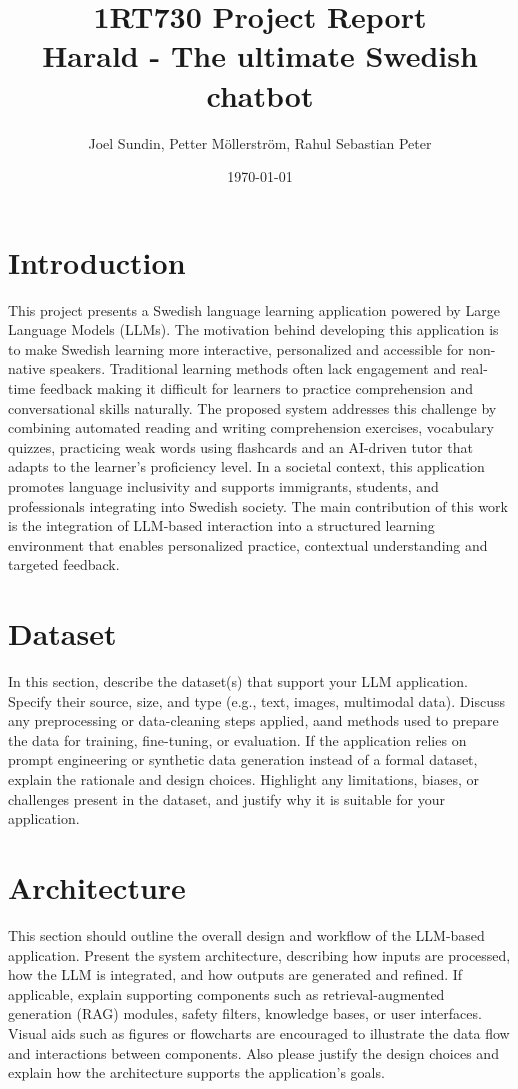 \documentclass[a4paper,10pt]{article}
\title{\textbf{1RT730 Project Report} 
	\\ Harald - The ultimate Swedish chatbot}
\author{Joel Sundin, Petter Möllerström, Rahul Sebastian Peter}
\date{\today}
\begin{document}
	
\maketitle
    
 \section{Introduction}
This project presents a Swedish language learning application powered by Large Language Models (LLMs). The motivation behind developing this application is to make Swedish learning more interactive, personalized and accessible for non-native speakers. Traditional learning methods often lack engagement and real-time feedback making it difficult for learners to practice comprehension and conversational skills naturally. The proposed system addresses this challenge by combining automated reading and writing comprehension exercises, vocabulary quizzes, practicing weak words using flashcards and an AI-driven tutor that adapts to the learner’s proficiency level. In a societal context, this application promotes language inclusivity and supports immigrants, students, and professionals integrating into Swedish society. The main contribution of this work is the integration of LLM-based interaction into a structured learning environment that enables personalized practice, contextual understanding and targeted feedback.


\section{Dataset}
In this section, describe the dataset(s) that support your LLM application. Specify their source, size, and type (e.g., text, images, multimodal data). Discuss any preprocessing or data-cleaning steps applied, aand methods used to prepare the data for training, fine-tuning, or evaluation. If the application relies on prompt engineering or synthetic data generation instead of a formal dataset, explain the rationale and design choices. Highlight any limitations, biases, or challenges present in the dataset, and justify why it is suitable for your application.

\section{Architecture}
This section should outline the overall design and workflow of the LLM-based application. Present the system architecture, describing how inputs are processed, how the LLM is integrated, and how outputs are generated and refined. If applicable, explain supporting components such as retrieval-augmented generation (RAG) modules, safety filters, knowledge bases, or user interfaces. Visual aids such as figures or flowcharts are encouraged to illustrate the data flow and interactions between components. Also please justify the design choices and explain how the architecture supports the application's goals.
\end{document}
